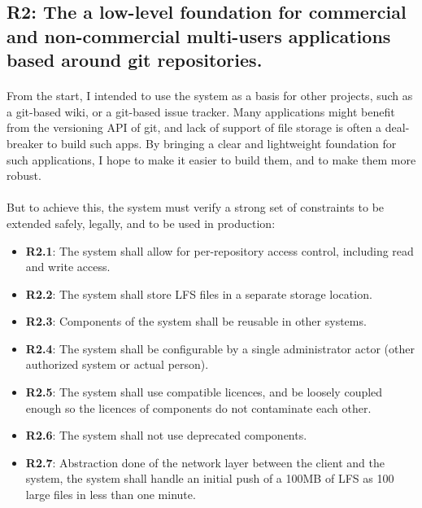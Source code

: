 \subsection{R2: The a low-level foundation for commercial and non-commercial multi-users applications based around git repositories.}

\paragraph{}
From the start, I intended to use the system as a basis for other projects, such as a git-based wiki, or a git-based issue tracker. Many applications might benefit from the versioning API of git, and lack of support of file storage is often a deal-breaker to build such apps. By bringing a clear and lightweight foundation for such applications, I hope to make it easier to build them, and to make them more robust.

\paragraph{}
But to achieve this, the system must verify a strong set of constraints to be extended safely, legally, and to be used in production: 

\begin{itemize}
    \item \textbf{R2.1}: The system shall allow for per-repository access control, including read and write access.
    \item \textbf{R2.2}: The system shall store LFS files in a separate storage location.
    \item \textbf{R2.3}: Components of the system shall be reusable in other systems.
    \item \textbf{R2.4}: The system shall be configurable by a single administrator actor (other authorized system or actual person).
    \item \textbf{R2.5}: The system shall use compatible licences, and be loosely coupled enough so the licences of components do not contaminate each other. 
    \item \textbf{R2.6}: The system shall not use deprecated components.
    \item \textbf{R2.7}: Abstraction done of the network layer between the client and the system, the system shall handle an initial push of a 100MB of LFS as 100 large files in less than one minute.
\end{itemize}

